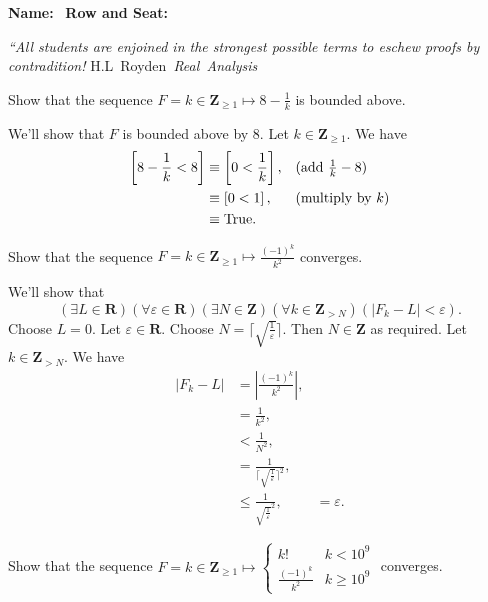 \documentclass[12pt, fleqn]{exam}
\newcommand{\reals}{\mathbf{R}}
\newcommand{\integers}{\mathbf{Z}}
\newcommand{\True}{\mathrm{True}}
\begin{document}
\large
\vspace{0.1in}
\noindent{}
{\bf Name:}\hrulefill\
\noindent {}
{\bf Row and Seat:}\hrulefill\

\vspace{0.1in}

\small
\noindent \emph{``All students are enjoined in the strongest possible terms to eschew proofs by contradition!} \hfill \mbox{{\sc H.L Royden} \emph{Real Analysis}}
\normalsize
\begin{questions}

\question Show that the sequence $F = k \in \integers_{\geq 1} \mapsto 8 - \frac{1}{k}$ is
bounded above.
\begin{solution}We'll show that $F$ is bounded above by 8. Let $k \in \integers_{\geq 1} $. We have
\begin{align*}
 \left[ 8 - \frac{1}{k} < 8 \right] &\equiv \left[  0 <  \frac{1}{k} \right], && \mbox{(add $ \frac{1}{k} -8$)} \\
                                               & \equiv \left[  0 < 1 \right], && \mbox{(multiply by $k$)} \\
  &\equiv \True.
\end{align*}

\end{solution}
\question Show that the sequence $F = k \in \integers_{\geq 1} \mapsto \frac{(-1)^k}{k^2}$ converges.
\begin{solution} We'll show that
\begin{equation}
 \left(\exists L \in \reals \right)
 \left(\forall \varepsilon \in \reals\right)
 \left(\exists N \in \integers\right)
 \left(\forall k \in \integers_{>N} \right)
 \left(|F_k - L | < \varepsilon\right).
\end{equation}
Choose $L = 0$. Let  $\varepsilon \in \reals$. Choose $N =  \lceil \sqrt{\frac{1}{\varepsilon}} \rceil $. 
Then $N \in \integers$ as required.  Let $k \in \integers_{> N}$. We have
\begin{align*}
   |F_k -L | &= |\frac{(-1)^k}{k^2}|, \\
                 &= \frac{1}{k^2}, \\
                 &< \frac{1}{N^2}, \\
                 &=  \frac{1}{\lceil \sqrt{\frac{1}{\varepsilon}} \rceil^2}, \\
                 &\leq \frac{1}{\sqrt{\frac{1}{\varepsilon}}^2}, 
                 &= \varepsilon.
\end{align*}
\end{solution}
\question Show that the sequence $F = k \in \integers_{\geq 1} \mapsto \begin{cases} k! & k < 10^9 \\
\frac{(-1)^k}{k^2} & k \geq 10^9 \end{cases}$ converges.


\end{questions}
\end{document}

